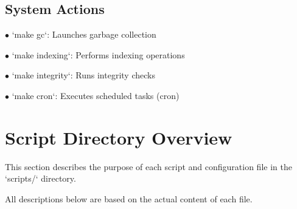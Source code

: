 \documentclass[a4paper]{article}
\begin{document}
\hypertarget{toc29}{}
\subsection{System Actions}

\begin{compactitem}
\item[\color{myblue}$\bullet$] `make gc`: Launches garbage collection
\item[\color{myblue}$\bullet$] `make indexing`: Performs indexing operations
\item[\color{myblue}$\bullet$] `make integrity`: Runs integrity checks
\item[\color{myblue}$\bullet$] `make cron`: Executes scheduled tasks (cron)
\end{compactitem}


\hypertarget{toc30}{}
\section{Script Directory Overview}

This section describes the purpose of each script and configuration file in the `scripts/` directory.

All descriptions below are based on the actual content of each file.
\end{document}
